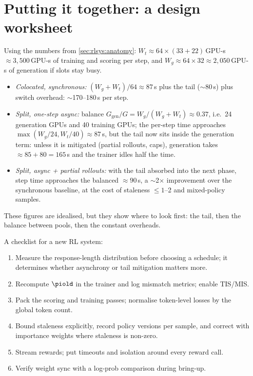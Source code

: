 \section{Putting it together: a design worksheet}\label{sec:rlsys:design}

\begin{napkinmath}
Using the numbers from \cref{sec:rlsys:anatomy}: $W_t \approx 64\times(33+22)$\,GPU-s
$\approx 3{,}500$\,GPU-s of training and scoring per step, and
$W_g \approx 64 \times 32 \approx 2{,}050$\,GPU-s of generation if slots stay busy.
\begin{itemize}
\item \emph{Colocated, synchronous:} $(W_g+W_t)/64 \approx 87$\,s plus the tail ($\sim$80\,s) plus
switch overhead: $\sim$170--180\,s per step.
\item \emph{Split, one-step async:} balance $G_{\text{gen}}/G = W_g/(W_g+W_t)\approx 0.37$,
i.e.\ 24 generation GPUs and 40 training GPUs; the per-step time approaches
$\max(W_g/24, W_t/40)\approx 87$\,s, but the tail now sits inside the generation term: unless it
is mitigated (partial rollouts, caps), generation takes $\approx 85+80 = 165$\,s and the
trainer idles half the time.
\item \emph{Split, async + partial rollouts:} with the tail absorbed into the next phase, step
time approaches the balanced $\approx 90$\,s, a $\sim$2$\times$ improvement over the synchronous
baseline, at the cost of staleness $\le 1$--2 and mixed-policy samples.
\end{itemize}
These figures are idealised, but they show where to look first: the tail, then the balance
between pools, then the constant overheads.
\end{napkinmath}

A checklist for a new RL system:
\begin{enumerate}
\item Measure the response-length distribution before choosing a schedule; it determines
whether asynchrony or tail mitigation matters more.
\item Recompute $\piold$ in the trainer and log mismatch metrics; enable TIS/MIS.
\item Pack the scoring and training passes; normalise token-level losses by the global token
count.
\item Bound staleness explicitly, record policy versions per sample, and correct with
importance weights where staleness is non-zero.
\item Stream rewards; put timeouts and isolation around every reward call.
\item Verify weight sync with a log-prob comparison during bring-up.
\end{enumerate}


